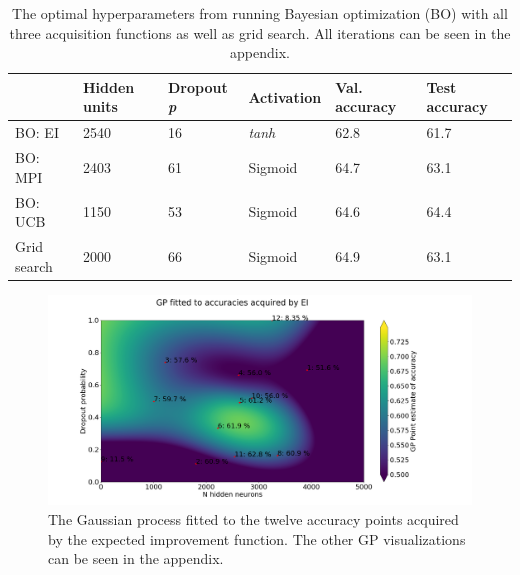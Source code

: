 \documentclass[12pt,fleqn]{article}
\begin{document}
\begin{table}[H]\label{resultater}
	\begin{tabular}{l|lllll}
		  & Hidden units & Dropout \textit{p} & Activation & Val. accuracy &Test accuracy \\ \hline
		BO: EI  & 2540      & 16\pro              & \textit{tanh}             &    62.8\pro & 61.7\pro   \\ 
		BO: MPI & 2403         & 61\pro             & Sigmoid             & 64.7\pro  & 63.1\pro     \\ 
		BO: UCB & 1150         & 53\pro              & Sigmoid             & 64.6\pro  & 64.4\pro     \\ 
		Grid search & 2000         & 66\pro              & Sigmoid             & 64.9\pro & 63.1\pro          \\
	\end{tabular}
	\caption{The optimal hyperparameters from running Bayesian optimization (BO) with all three acquisition functions as well as grid search. All iterations can be seen in the appendix.}
\end{table}
\begin{figure}
	\centering
	
	\includegraphics[width=\textwidth]{EIGP}	
	
	\caption{The Gaussian process fitted to the twelve accuracy points acquired by the expected improvement function. The other GP visualizations can be seen in the appendix.}
	\label{fig:gp}
\end{figure}
\end{document}
